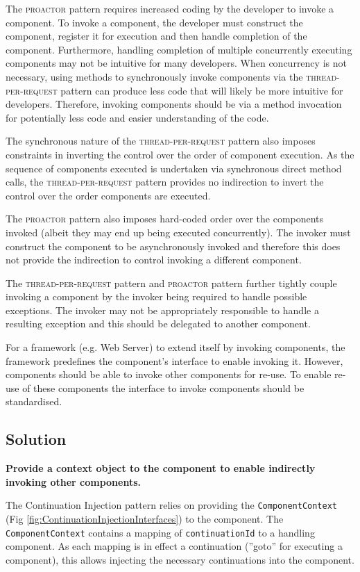 \documentclass[prodmode]{style/acmlarge}
\begin{document}
The \textsc{proactor} pattern requires increased coding by the developer to
invoke a component.  To invoke a component, the developer must construct the
component, register it for execution and then handle completion of the
component.  Furthermore, handling completion of multiple concurrently executing
components may not be intuitive for many developers.  When concurrency is not
necessary, using methods to synchronously invoke components via the
\textsc{thread-per-request} pattern can produce less code that will likely be
more intuitive for developers.  Therefore, invoking components should be via a
method invocation for potentially less code and easier understanding of the
code.

The synchronous nature of the \textsc{thread-per-request} pattern also imposes
constraints in inverting the control over the order of component execution.  As
the sequence of components executed is undertaken via synchronous direct method
calls, the \textsc{thread-per-request} pattern provides no indirection to invert
the control over the order components are executed.

The \textsc{proactor} pattern also imposes hard-coded order over the components
invoked (albeit they may end up being executed concurrently).  The invoker must
construct the component to be asynchronously invoked and therefore this does not
provide the indirection to control invoking a different component.

The \textsc{thread-per-request} pattern and \textsc{proactor} pattern further
tightly couple invoking a component by the invoker being required to handle
possible exceptions.  The invoker may not be appropriately responsible to handle
a resulting exception and this should be delegated to another component.

For a framework (e.g. Web Server) to extend itself by invoking components, the
framework predefines the component's interface to enable invoking it.  However,
components should be able to invoke other components for re-use.  To enable
re-use of these components the interface to invoke components should be
standardised.


\subsection{Solution}

\textbf{Provide a context object to the component to enable indirectly invoking other components.}

The Continuation Injection pattern relies on providing the
\texttt{ComponentContext} (Fig \ref{fig:ContinuationInjectionInterfaces}) to the
component.  The \texttt{ComponentContext} contains a mapping of
\texttt{continuationId} to a handling component.  As each mapping is in effect a
continuation (''goto'' for executing a component), this allows injecting the
necessary continuations into the component.
\end{document}

